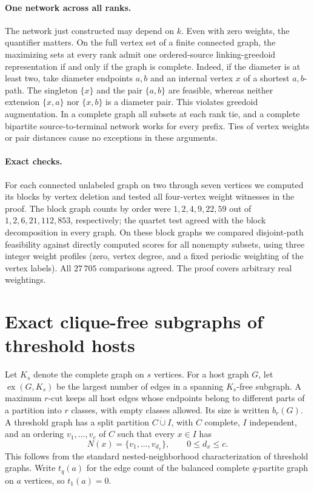 \documentclass[11pt,a4paper]{article}
\begin{document}
\paragraph{One network across all ranks.}
The network just constructed may depend on $k$. Even with zero weights,
the quantifier matters. On the full vertex set of a finite connected
graph, the maximizing sets at every rank admit one ordered-source
linking-greedoid representation if and only if the graph is complete.
Indeed, if the diameter is at least two, take diameter endpoints $a,b$
and an internal vertex $x$ of a shortest $a,b$-path. The singleton
$\{x\}$ and the pair $\{a,b\}$ are feasible, whereas neither extension
$\{x,a\}$ nor $\{x,b\}$ is a diameter pair. This violates greedoid
augmentation. In a complete graph all subsets at each rank tie, and a
complete bipartite source-to-terminal network works for every prefix.
Ties of vertex weights or pair distances cause no exceptions in these
arguments.

\paragraph{Exact checks.}
For each connected unlabeled graph on two through seven vertices we
computed its blocks by vertex deletion and tested all four-vertex
weight witnesses in the proof. The block graph counts by order were
$1,2,4,9,22,59$ out of $1,2,6,21,112,853$, respectively; the quartet test
agreed with the block decomposition in every graph. On these block graphs
we compared disjoint-path feasibility against directly computed scores
for all nonempty subsets, using three integer weight profiles (zero,
vertex degree, and a fixed periodic weighting of the vertex labels).
All $27\,705$ comparisons agreed. The proof covers arbitrary real
weightings.

\section{Exact clique-free subgraphs of threshold hosts}\label{sec:threshold-host}
Let $K_s$ denote the complete graph on $s$ vertices. For a host graph $G$, let $\operatorname{ex}(G,K_s)$ be the largest number of edges in a spanning $K_s$-free subgraph. A maximum $r$-cut keeps all host edges whose endpoints belong to different parts of a partition into $r$ classes, with empty classes allowed. Its size is written $b_r(G)$. A threshold graph has a split partition $C\mathbin{\dot\cup}I$, with $C$ complete, $I$ independent, and an ordering $v_1,\ldots,v_c$ of $C$ such that every $x\in I$ has
\[
 N(x)=\{v_1,\ldots,v_{d_x}\},\qquad 0\le d_x\le c .
\]
This follows from the standard nested-neighborhood characterization of threshold graphs. Write $t_q(a)$ for the edge count of the balanced complete $q$-partite graph on $a$ vertices, so $t_1(a)=0$.
\end{document}
